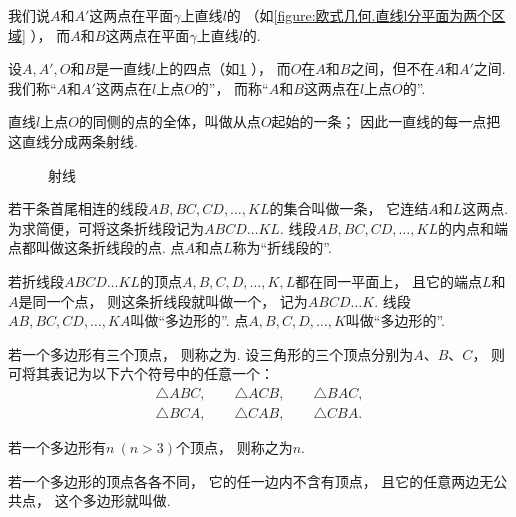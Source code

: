 \begin{definition}
我们说\(A\)和\(A'\)这两点在平面\(\gamma\)上直线\(l\)的%
（如\cref{figure:欧式几何.直线l分平面为两个区域} ），%
而\(A\)和\(B\)这两点在平面\(\gamma\)上直线\(l\)的.%
\end{definition}

\begin{definition}
设\(A,A',O\)和\(B\)是一直线\(l\)上的四点（如\cref{figure:欧式几何.射线} ），%
而\(O\)在\(A\)和\(B\)之间，但不在\(A\)和\(A'\)之间.
我们称“\(A\)和\(A'\)这两点在\(l\)上点\(O\)的”，%
而称“\(A\)和\(B\)这两点在\(l\)上点\(O\)的”.

直线\(l\)上点\(O\)的同侧的点的全体，叫做从点\(O\)起始的一条；
因此一直线的每一点把这直线分成两条射线.
\begin{figure}[ht]
\centering
{}
\caption{射线}
\label{figure:欧式几何.射线}
\end{figure}
\end{definition}

\begin{definition}
若干条首尾相连的线段\(AB,BC,CD,\dotsc,KL\)的集合叫做一条，%
它连结\(A\)和\(L\)这两点.
为求简便，可将这条折线段记为\(ABCD \dotso KL\).
线段\(AB,BC,CD,\dotsc,KL\)的内点和端点都叫做这条折线段的点.
点\(A\)和点\(L\)称为“折线段的”.

若折线段\(ABCD \dotso KL\)的顶点\(A,B,C,D,\dotsc,K,L\)都在同一平面上，%
且它的端点\(L\)和\(A\)是同一个点，%
则这条折线段就叫做一个，%
记为\(ABCD \dotso K\).
线段\(AB,BC,CD,\dotsc,KA\)叫做“多边形的”.
点\(A,B,C,D,\dotsc,K\)叫做“多边形的”.

若一个多边形有三个顶点，%
则称之为.
设三角形的三个顶点分别为\(A\)、\(B\)、\(C\)，%
则可将其表记为以下六个符号中的任意一个：
\[
\begin{split}
\triangle ABC, \qquad
\triangle ACB, \qquad
\triangle BAC, \\
\triangle BCA, \qquad
\triangle CAB, \qquad
\triangle CBA.
\end{split}
\]

若一个多边形有\(n\ (n>3)\)个顶点，%
则称之为\(n\).

若一个多边形的顶点各各不同，%
它的任一边内不含有顶点，%
且它的任意两边无公共点，%
这个多边形就叫做.
\end{definition}

